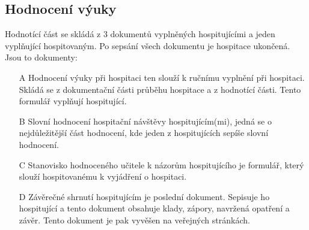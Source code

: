 \subsection{Hodnocení výuky}
Hodnotící část se skládá z 3 dokumentů vyplněných hospitujícími a jeden vyplňující hospitovaným. Po sepsání všech dokumentu je hospitace ukončená. Jsou to dokumenty:
\begin{itemize}
\item[A] Hodnocení výuky při hospitaci ten slouží k ručnímu vyplnění při hospitaci. Skládá se z dokumentační části průběhu hospitace a z hodnotící části. Tento formulář vyplňují hospitující.
\item[B] Slovní hodnocení hospitační návštěvy hospitujícím(mi), jedná se o nejdůležitější část hodnocení, kde jeden z hospitujících sepíše slovní hodnocení.
\item[C] Stanovisko hodnoceného učitele k názorům hospitujícího je formulář, který slouží hospitovanému k vyjádření o hospitaci.
\item[D] Závěrečné shrnutí hospitujícím je poslední dokument. Sepisuje ho hospitující a tento dokument obsahuje klady, zápory, navržená opatření a závěr. Tento dokument je pak vyvěšen na veřejných stránkách.
\end{itemize}